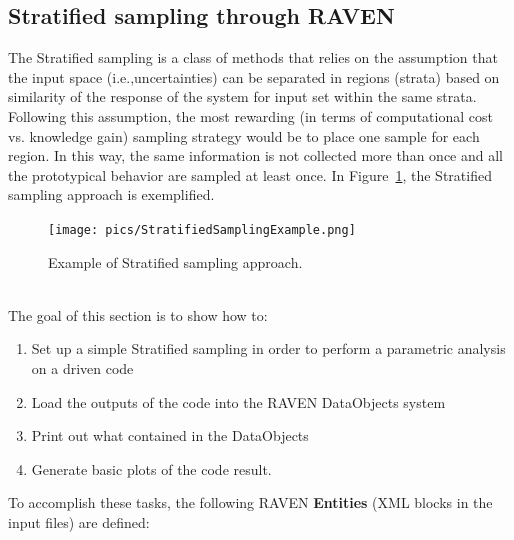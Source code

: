 \subsection{Stratified sampling through RAVEN}
\label{sub:Stratifiedexample}
The Stratified sampling is a class of methods that relies on the assumption that the input space (i.e.,uncertainties)
can be separated in regions (strata) based on similarity of the response of the system for input set within the
same strata. Following this assumption, the most rewarding (in terms of computational cost vs. knowledge gain)
sampling strategy would be to place one sample for each region. In this way, the same information is not
collected more than once and all the prototypical behavior are sampled at least once. In
Figure~\ref{fig:StratifiedSamplingExample}, the Stratified sampling approach is exemplified.
 \begin{figure}[h!]
  \centering
  \texttt{[image: pics/StratifiedSamplingExample.png]}
  \caption{Example of Stratified sampling approach.}
  \label{fig:StratifiedSamplingExample}
 \end{figure}
\\The goal of this section is to show how to:
 \begin{enumerate}
   \item Set up a simple Stratified sampling in order to perform a parametric analysis on a driven code
   \item Load the outputs of the code into the RAVEN DataObjects system
   \item Print out what contained in the DataObjects
   \item Generate basic plots of the code result.
\end{enumerate}
To accomplish these tasks, the following RAVEN \textbf{Entities} (XML blocks in the input files) are defined:

